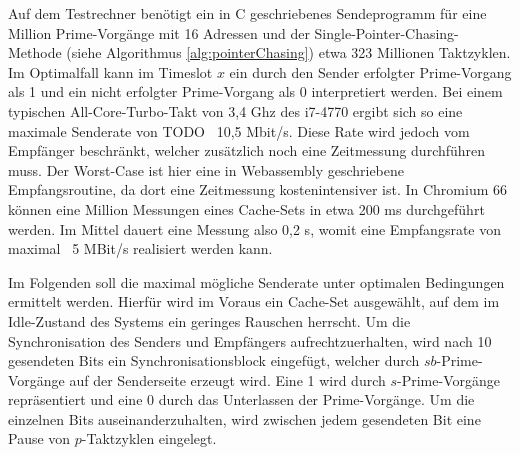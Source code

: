 Auf dem Testrechner benötigt ein in C geschriebenes Sendeprogramm für eine Million Prime-Vorgänge mit 16 Adressen und der Single-Pointer-Chasing-Methode (siehe Algorithmus \ref{alg:pointerChasing}) etwa 323 Millionen Taktzyklen.
Im Optimalfall kann im Timeslot $x$ ein durch den Sender erfolgter Prime-Vorgang als 1 und ein nicht erfolgter Prime-Vorgang  als 0 interpretiert werden.
Bei einem typischen All-Core-Turbo-Takt von 3,4 Ghz des i7-4770 ergibt sich so eine maximale Senderate von TODO ~10,5 Mbit/s.
Diese Rate wird jedoch vom Empfänger beschränkt, welcher zusätzlich noch eine Zeitmessung durchführen muss. Der Worst-Case ist hier eine in Webassembly geschriebene Empfangsroutine, da dort eine Zeitmessung kostenintensiver ist. In Chromium 66 können eine Million Messungen eines Cache-Sets in etwa 200 ms durchgeführt werden.
Im Mittel dauert eine Messung also 0,2 \textmu s, womit eine Empfangsrate von maximal ~5 MBit/s realisiert werden kann.

Im Folgenden soll die maximal mögliche Senderate unter optimalen Bedingungen ermittelt werden. 
Hierfür wird im Voraus ein Cache-Set ausgewählt, auf dem im Idle-Zustand des Systems ein geringes Rauschen herrscht.
Um die Synchronisation des Senders und Empfängers aufrechtzuerhalten, wird nach 10 gesendeten Bits ein Synchronisationsblock eingefügt, welcher durch $sb$-Prime-Vorgänge auf der Senderseite erzeugt wird. 
Eine 1 wird durch $s$-Prime-Vorgänge repräsentiert und eine 0 durch das Unterlassen der Prime-Vorgänge. 
Um die einzelnen Bits auseinanderzuhalten, wird zwischen jedem gesendeten Bit eine Pause von $p$-Taktzyklen eingelegt. 






\newtext




\newtextend


